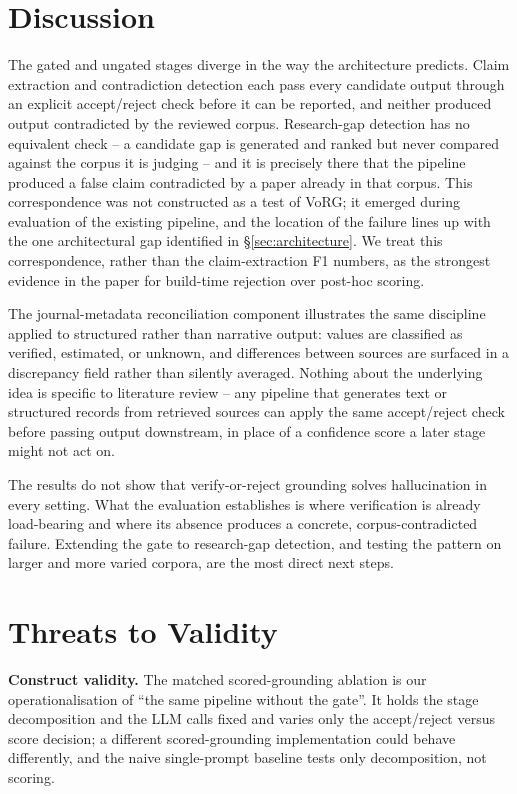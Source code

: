 \documentclass[11pt]{article}
\begin{document}
\section{Discussion}
\label{sec:discussion}

The gated and ungated stages diverge in the way the architecture predicts.
Claim extraction and contradiction detection each pass every candidate output
through an explicit accept/reject check before it can be reported, and neither
produced output contradicted by the reviewed corpus. Research-gap detection has
no equivalent check -- a candidate gap is generated and ranked but never
compared against the corpus it is judging -- and it is precisely there that the
pipeline produced a false claim contradicted by a paper already in that corpus.
This correspondence was not constructed as a test of VoRG; it emerged during
evaluation of the existing pipeline, and the location of the failure lines up
with the one architectural gap identified in \S\ref{sec:architecture}. We treat
this correspondence, rather than the claim-extraction F1 numbers, as the
strongest evidence in the paper for build-time rejection over post-hoc scoring.

The journal-metadata reconciliation component illustrates the same discipline
applied to structured rather than narrative output: values are classified as
verified, estimated, or unknown, and differences between sources are surfaced in
a discrepancy field rather than silently averaged. Nothing about the underlying
idea is specific to literature review -- any pipeline that generates text or
structured records from retrieved sources can apply the same accept/reject check
before passing output downstream, in place of a confidence score a later stage
might not act on.

The results do not show that verify-or-reject grounding solves hallucination in
every setting. What the evaluation establishes is where verification is already
load-bearing and where its absence produces a concrete, corpus-contradicted
failure. Extending the gate to research-gap detection, and testing the pattern
on larger and more varied corpora, are the most direct next steps.

\section{Threats to Validity}
\label{sec:threats}
\label{sec:limitations}

\textbf{Construct validity.} The matched scored-grounding ablation is our
operationalisation of ``the same pipeline without the gate''. It holds the
stage decomposition and the LLM calls fixed and varies only the accept/reject
versus score decision; a different scored-grounding implementation could behave
differently, and the naive single-prompt baseline tests only decomposition, not
scoring.
\end{document}
